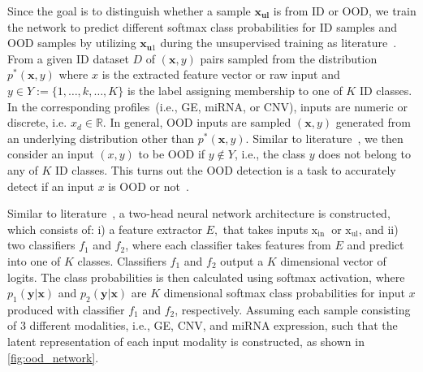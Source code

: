 \hspace*{3.5mm} Since the goal is to distinguish whether a sample $\mathbf{x}_{\mathbf{ul}}$ is from ID or OOD, we train the network to predict different softmax class probabilities for ID samples and OOD samples by utilizing $\mathbf{x}_{\mathbf{u}1}$ during the unsupervised training as literature~\cite{OOD19}. From a given ID dataset ${D}$ of $(\boldsymbol{x}, y)$ pairs sampled from the distribution $p^{*}(\boldsymbol{x}, y)$ where $x$ is the extracted feature vector or raw input and $y \in {Y}:=\{1, \ldots, k, \ldots, K\}$ is the label assigning membership to one of $K$ ID classes. In the corresponding profiles~(i.e., GE, miRNA, or CNV), inputs are numeric or discrete, i.e. $x_{d} \in \mathbb{R}$. In general, OOD inputs are sampled $(\boldsymbol{x}, y)$ generated from an underlying distribution other than $p^{*}(\boldsymbol{x}, y)$. Similar to literature~\cite{OOD1}, we then consider an input $(x, y)$ to be OOD if $y \notin {Y}$, i.e., the class $y$ does not belong to any of $K$ ID classes. This turns out the OOD detection is a task to accurately detect if an input $x$ is OOD or not~\cite{OOD1,OOD2,OOD3}.

\hspace*{3.5mm} Similar to literature~\cite{yu2019unsupervised}, a two-head neural network architecture is constructed, which consists of: i) a feature extractor $E,$ that takes inputs $\mathrm{x}_{\text {in }}$ or $\mathrm{x}_{\mathrm{ul}}$, and ii) two classifiers $f_{1}$ and $f_{2}$, where each classifier takes features from $E$ and predict into one of $K$ classes. Classifiers $f_{1}$ and $f_{2}$ output a $K$ dimensional vector of logits. The class probabilities is then calculated using softmax activation, where $p_{1}(\mathbf{y} | \mathbf{x})$ and $p_{2}(\mathbf{y} | \mathbf{x})$ are $K$ dimensional softmax class probabilities for input $x$ produced with classifier $f_{1}$ and $f_{2}$, respectively. Assuming each sample consisting of 3 different modalities, i.e., GE, CNV, and miRNA expression, such that the latent representation of each input modality is constructed, as shown in \cref{fig:ood_network}. 

